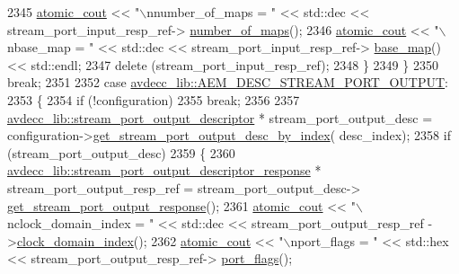 \begin{DoxyCode}
2345             \hyperlink{cmd__line_8h_a0bc38ccc65c79ba06c6fcd7b4bf554c3}{atomic\_cout} << \textcolor{stringliteral}{"\(\backslash\)nnumber\_of\_maps = "} << std::dec << stream\_port\_input\_resp\_ref->
      \hyperlink{classavdecc__lib_1_1stream__port__input__descriptor__response_acda32e14eb207ebd11856fab5172173c}{number\_of\_maps}();
2346             \hyperlink{cmd__line_8h_a0bc38ccc65c79ba06c6fcd7b4bf554c3}{atomic\_cout} << \textcolor{stringliteral}{"\(\backslash\)nbase\_map = "} << std::dec << stream\_port\_input\_resp\_ref->
      \hyperlink{classavdecc__lib_1_1stream__port__input__descriptor__response_aec19e0ab011108a60ce3e82bc682e5e0}{base\_map}() << std::endl;
2347             \textcolor{keyword}{delete} (stream\_port\_input\_resp\_ref);
2348         \}
2349     \}
2350     \textcolor{keywordflow}{break};
2351 
2352     \textcolor{keywordflow}{case} \hyperlink{namespaceavdecc__lib_ac7b7d227e46bc72b63ee9e9aae15902fa2b2dca37bb2c945a2b37b02231650b48}{avdecc\_lib::AEM\_DESC\_STREAM\_PORT\_OUTPUT}:
2353     \{
2354         \textcolor{keywordflow}{if} (!configuration)
2355             \textcolor{keywordflow}{break};
2356 
2357         \hyperlink{classavdecc__lib_1_1stream__port__output__descriptor}{avdecc\_lib::stream\_port\_output\_descriptor} * 
      stream\_port\_output\_desc = configuration->\hyperlink{classavdecc__lib_1_1configuration__descriptor_afc0e79843f9b98263f9be9d16197310b}{get\_stream\_port\_output\_desc\_by\_index}(
      desc\_index);
2358         \textcolor{keywordflow}{if} (stream\_port\_output\_desc)
2359         \{
2360             \hyperlink{classavdecc__lib_1_1stream__port__output__descriptor__response}{avdecc\_lib::stream\_port\_output\_descriptor\_response}
       * stream\_port\_output\_resp\_ref = stream\_port\_output\_desc->
      \hyperlink{classavdecc__lib_1_1stream__port__output__descriptor_ad55a65e8648f66713ad5c9a7b9fa7181}{get\_stream\_port\_output\_response}();
2361             \hyperlink{cmd__line_8h_a0bc38ccc65c79ba06c6fcd7b4bf554c3}{atomic\_cout} << \textcolor{stringliteral}{"\(\backslash\)nclock\_domain\_index = "} << std::dec << stream\_port\_output\_resp\_ref
      ->\hyperlink{classavdecc__lib_1_1stream__port__output__descriptor__response_aab7f93d403d8b73f8f4a8fb7c61ecded}{clock\_domain\_index}();
2362             \hyperlink{cmd__line_8h_a0bc38ccc65c79ba06c6fcd7b4bf554c3}{atomic\_cout} << \textcolor{stringliteral}{"\(\backslash\)nport\_flags = "} << std::hex << stream\_port\_output\_resp\_ref->
      \hyperlink{classavdecc__lib_1_1stream__port__output__descriptor__response_a66bad2f1317cba04f0ea271f7181b58f}{port\_flags}();

\end{DoxyCode}
